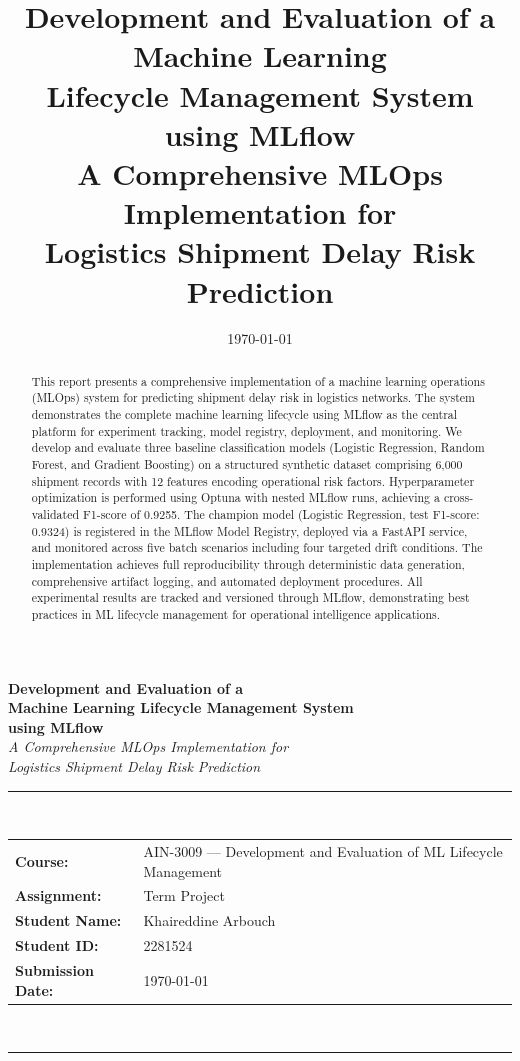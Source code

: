 \documentclass[11pt,a4paper]{article}
\title{\vspace{-0.8cm}\textbf{Development and Evaluation of a Machine Learning\\
Lifecycle Management System using MLflow}\\[8pt]
\large A Comprehensive MLOps Implementation for\\
Logistics Shipment Delay Risk Prediction}
\author{}
\date{\today}
\newcommand{\Course}{AIN-3009 — Development and Evaluation of ML Lifecycle Management}
\newcommand{\Assignment}{Term Project}
\newcommand{\AuthorName}{Khaireddine Arbouch}
\newcommand{\StudentID}{2281524}
\begin{document}
\begin{center}
{\LARGE\bfseries Development and Evaluation of a\\[4pt]
Machine Learning Lifecycle Management System\\[4pt]
using MLflow}\\[12pt]
{\large\itshape A Comprehensive MLOps Implementation for\\
Logistics Shipment Delay Risk Prediction}\\[20pt]
\rule{\linewidth}{0.5pt}\\[12pt]
\begin{tabular}{@{}ll@{}}
\textbf{Course:}      & \Course \\
\textbf{Assignment:}  & \Assignment \\
\textbf{Student Name:}        & \AuthorName \\
\textbf{Student ID:}  & \StudentID \\
\textbf{Submission Date:}        & \today \\
\end{tabular}\\[12pt]
\rule{\linewidth}{0.5pt}
\end{center}
\thispagestyle{empty}
\vspace{15pt}

\begin{abstract}
\noindent
This report presents a comprehensive implementation of a machine learning operations (MLOps) system for predicting shipment delay risk in logistics networks. The system demonstrates the complete machine learning lifecycle using MLflow as the central platform for experiment tracking, model registry, deployment, and monitoring. We develop and evaluate three baseline classification models (Logistic Regression, Random Forest, and Gradient Boosting) on a structured synthetic dataset comprising 6,000 shipment records with 12 features encoding operational risk factors. Hyperparameter optimization is performed using Optuna with nested MLflow runs, achieving a cross-validated F1-score of 0.9255. The champion model (Logistic Regression, test F1-score: 0.9324) is registered in the MLflow Model Registry, deployed via a FastAPI service, and monitored across five batch scenarios including four targeted drift conditions. The implementation achieves full reproducibility through deterministic data generation, comprehensive artifact logging, and automated deployment procedures. All experimental results are tracked and versioned through MLflow, demonstrating best practices in ML lifecycle management for operational intelligence applications.
\end{abstract}
\end{document}
